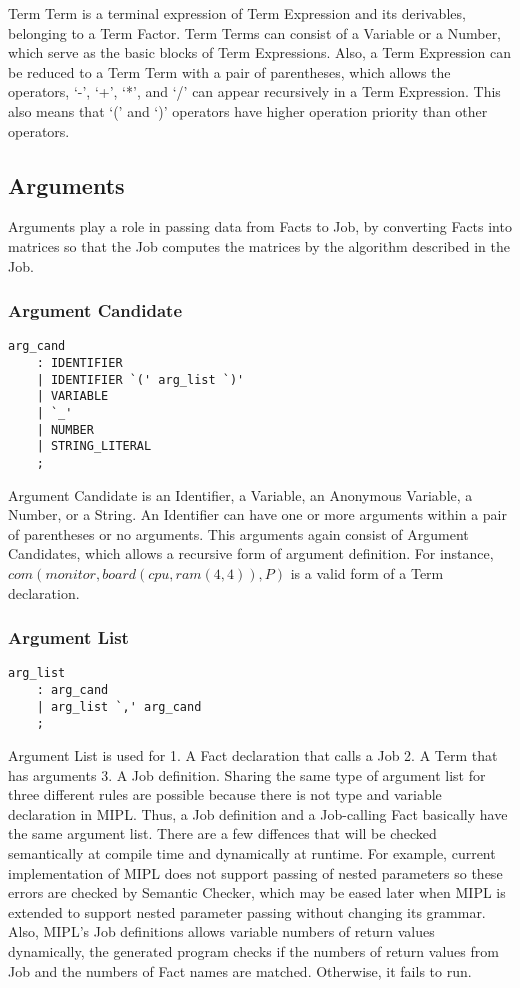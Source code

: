\documentclass[prodmode,acmtecs]{acmsmall}
\begin{document}
Term Term is a terminal expression of Term Expression and its derivables,
belonging to a Term Factor.  Term Terms can consist of a Variable or a
Number, which serve as the basic blocks of Term Expressions.  Also, a Term
Expression can be reduced to a Term Term with a pair of parentheses, which
allows the operators, `-', `+', `*', and `/' can appear recursively in a
Term Expression.  This also means that `(' and `)' operators have higher
operation priority than other operators.

\subsection{Arguments}
Arguments play a role in passing data from Facts to Job, by converting Facts
into matrices so that the Job computes the matrices by the algorithm
described in the Job.

\subsubsection{Argument Candidate}
\begin{lstlisting}
arg_cand
	: IDENTIFIER
	| IDENTIFIER `(' arg_list `)'
	| VARIABLE
	| `_'
	| NUMBER
	| STRING_LITERAL
	;
\end{lstlisting}

Argument Candidate is an Identifier, a Variable, an Anonymous
Variable, a Number, or a String.  An Identifier can have one
or more arguments within a pair of parentheses or no arguments.
This arguments again consist of Argument Candidates, which
allows a recursive form of argument definition.  For instance, 
$com(monitor, board(cpu, ram(4, 4)), P)$ is a valid form
of a Term declaration.

\subsubsection{Argument List}
\begin{lstlisting}
arg_list
	: arg_cand
	| arg_list `,' arg_cand
	;
\end{lstlisting}

Argument List is used for 1. A Fact declaration that calls a Job
2. A Term that has arguments 3. A Job definition.  Sharing the
same type of argument list for three different rules are possible
because there is not type and variable declaration in MIPL.  Thus,
a Job definition and a Job-calling Fact basically have the same
argument list.  There are a few diffences that will be checked
semantically at compile time and dynamically at runtime.  For example,
current implementation of MIPL does not support passing of nested
parameters so these errors are checked by Semantic Checker, which may
be eased later when MIPL is extended to support nested parameter passing
without changing its grammar.  Also, MIPL's Job definitions allows
variable numbers of return values dynamically, the generated program
checks if the numbers of return values from Job and the numbers of
Fact names are matched.  Otherwise, it fails to run.
\end{document}
